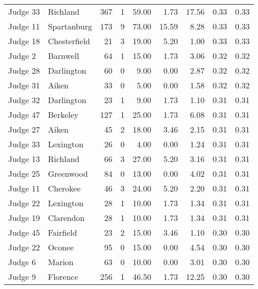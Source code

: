 \begin{tabular}{llrrrrrrr}
Judge 33 &     Richland &   367 &      1 & 59.00 &       1.73 &     17.56 &         0.33 &      0.33 \\
Judge 11 &  Spartanburg &   173 &      9 & 73.00 &      15.59 &      8.28 &         0.33 &      0.33 \\
Judge 18 & Chesterfield &    21 &      3 & 19.00 &       5.20 &      1.00 &         0.33 &      0.33 \\
 Judge 2 &     Barnwell &    64 &      1 & 15.00 &       1.73 &      3.06 &         0.32 &      0.32 \\
Judge 28 &   Darlington &    60 &      0 &  9.00 &       0.00 &      2.87 &         0.32 &      0.32 \\
Judge 31 &        Aiken &    33 &      0 &  5.00 &       0.00 &      1.58 &         0.32 &      0.32 \\
Judge 32 &   Darlington &    23 &      1 &  9.00 &       1.73 &      1.10 &         0.31 &      0.31 \\
Judge 47 &     Berkeley &   127 &      1 & 25.00 &       1.73 &      6.08 &         0.31 &      0.31 \\
Judge 27 &        Aiken &    45 &      2 & 18.00 &       3.46 &      2.15 &         0.31 &      0.31 \\
Judge 33 &    Lexington &    26 &      0 &  4.00 &       0.00 &      1.24 &         0.31 &      0.31 \\
Judge 13 &     Richland &    66 &      3 & 27.00 &       5.20 &      3.16 &         0.31 &      0.31 \\
Judge 25 &    Greenwood &    84 &      0 & 13.00 &       0.00 &      4.02 &         0.31 &      0.31 \\
Judge 11 &     Cherokee &    46 &      3 & 24.00 &       5.20 &      2.20 &         0.31 &      0.31 \\
Judge 22 &    Lexington &    28 &      1 & 10.00 &       1.73 &      1.34 &         0.31 &      0.31 \\
Judge 19 &    Clarendon &    28 &      1 & 10.00 &       1.73 &      1.34 &         0.31 &      0.31 \\
Judge 45 &    Fairfield &    23 &      2 & 15.00 &       3.46 &      1.10 &         0.30 &      0.30 \\
Judge 22 &       Oconee &    95 &      0 & 15.00 &       0.00 &      4.54 &         0.30 &      0.30 \\
 Judge 6 &       Marion &    63 &      0 & 10.00 &       0.00 &      3.01 &         0.30 &      0.30 \\
 Judge 9 &     Florence &   256 &      1 & 46.50 &       1.73 &     12.25 &         0.30 &      0.30 \\

\end{tabular}

